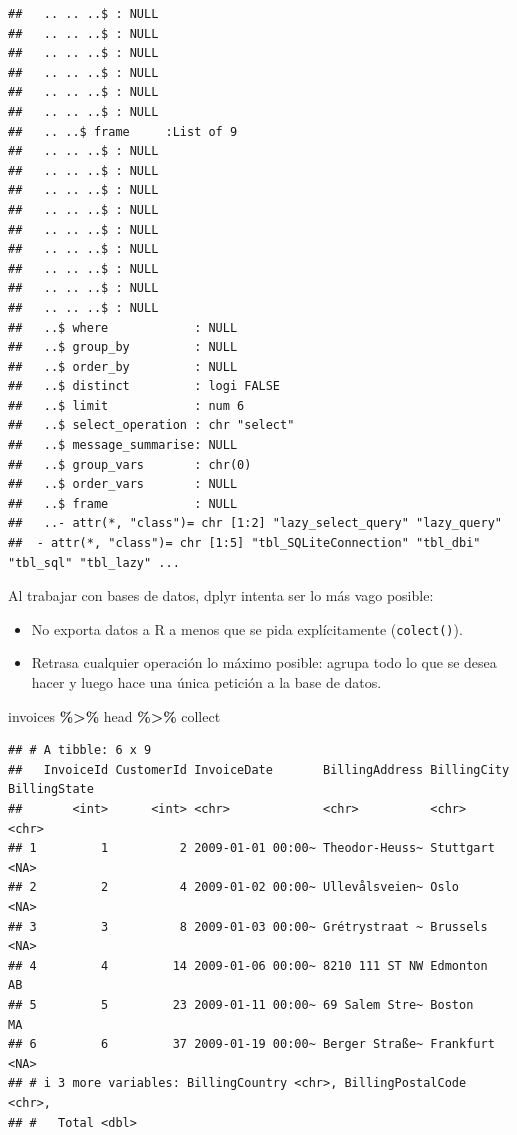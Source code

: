 \documentclass[
]{book}
\newenvironment{Shaded}{\begin{snugshade}}{\end{snugshade}}
\newcommand{\NormalTok}[1]{#1}
\newcommand{\SpecialCharTok}[1]{\textcolor[rgb]{0.81,0.36,0.00}{\textbf{#1}}}
\begin{document}
\begin{verbatim}
##   .. .. ..$ : NULL
##   .. .. ..$ : NULL
##   .. .. ..$ : NULL
##   .. .. ..$ : NULL
##   .. .. ..$ : NULL
##   .. .. ..$ : NULL
##   .. ..$ frame     :List of 9
##   .. .. ..$ : NULL
##   .. .. ..$ : NULL
##   .. .. ..$ : NULL
##   .. .. ..$ : NULL
##   .. .. ..$ : NULL
##   .. .. ..$ : NULL
##   .. .. ..$ : NULL
##   .. .. ..$ : NULL
##   .. .. ..$ : NULL
##   ..$ where            : NULL
##   ..$ group_by         : NULL
##   ..$ order_by         : NULL
##   ..$ distinct         : logi FALSE
##   ..$ limit            : num 6
##   ..$ select_operation : chr "select"
##   ..$ message_summarise: NULL
##   ..$ group_vars       : chr(0) 
##   ..$ order_vars       : NULL
##   ..$ frame            : NULL
##   ..- attr(*, "class")= chr [1:2] "lazy_select_query" "lazy_query"
##  - attr(*, "class")= chr [1:5] "tbl_SQLiteConnection" "tbl_dbi" "tbl_sql" "tbl_lazy" ...
\end{verbatim}

Al trabajar con bases de datos, dplyr intenta ser lo más vago posible:

\begin{itemize}
\item
  No exporta datos a R a menos que se pida explícitamente (\texttt{colect()}).
\item
  Retrasa cualquier operación lo máximo posible:
  agrupa todo lo que se desea hacer y luego hace una única petición a la base de datos.
\end{itemize}

\begin{Shaded}
\begin{Highlighting}[]
\NormalTok{invoices }\SpecialCharTok{\%\textgreater{}\%}\NormalTok{ head }\SpecialCharTok{\%\textgreater{}\%}\NormalTok{ collect}
\end{Highlighting}
\end{Shaded}

\begin{verbatim}
## # A tibble: 6 x 9
##   InvoiceId CustomerId InvoiceDate       BillingAddress BillingCity BillingState
##       <int>      <int> <chr>             <chr>          <chr>       <chr>       
## 1         1          2 2009-01-01 00:00~ Theodor-Heuss~ Stuttgart   <NA>        
## 2         2          4 2009-01-02 00:00~ Ullevålsveien~ Oslo        <NA>        
## 3         3          8 2009-01-03 00:00~ Grétrystraat ~ Brussels    <NA>        
## 4         4         14 2009-01-06 00:00~ 8210 111 ST NW Edmonton    AB          
## 5         5         23 2009-01-11 00:00~ 69 Salem Stre~ Boston      MA          
## 6         6         37 2009-01-19 00:00~ Berger Straße~ Frankfurt   <NA>        
## # i 3 more variables: BillingCountry <chr>, BillingPostalCode <chr>,
## #   Total <dbl>
\end{verbatim}
\end{document}
